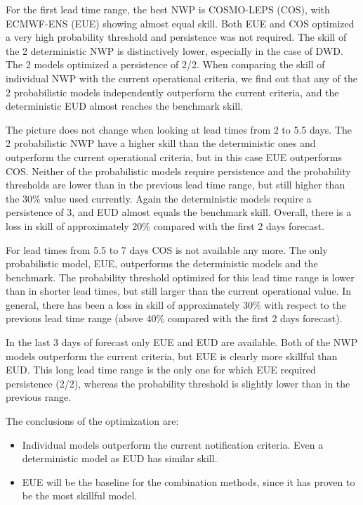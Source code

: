 \documentclass[preprint,12pt]{elsarticle}
\begin{document}
For the first lead time range, the best NWP is COSMO-LEPS (COS), with ECMWF-ENS (EUE) showing almost equal skill. Both EUE and COS optimized a very high probability threshold and persistence was not required. The skill of the 2 deterministic NWP is distinctively lower, especially in the case of DWD. The 2 models optimized a persistence of 2/2. When comparing the skill of individual NWP with the current operational criteria, we find out that any of the 2 probabilistic models independently outperform the current criteria, and the deterministic EUD almost reaches the benchmark skill.

The picture does not change when looking at lead times from 2 to 5.5 days. The 2 probabilistic NWP have a higher skill than the deterministic ones and outperform the current operational criteria, but in this case EUE outperforms COS. Neither of the probabilistic models require persistence and the probability thresholds are lower than in the previous lead time range, but still higher than the 30\% value used currently. Again the deterministic models require a persistence of 3, and EUD almost equals the benchmark skill. Overall, there is a loss in skill of approximately 20\% compared with the first 2 days forecast. 

For lead times from 5.5 to 7 days COS is not available any more. The only probabilistic model, EUE, outperforms the deterministic models and the benchmark. The probability threshold optimized for this lead time range is lower than in shorter lead times, but still larger than the current operational value. In general, there has been a loss in skill of approximately 30\% with respect to the previous lead time range (above 40\% compared with the first 2 days forecast).

In the last 3 days of forecast only EUE and EUD are available. Both of the NWP models outperform the current criteria, but EUE is clearly more skillful than EUD. This long lead time range is the only one for which EUE required persistence (2/2), whereas the probability threshold is slightly lower than in the previous range.

The conclusions of the optimization are:

\begin{itemize}
    \item Individual models outperform the current notification criteria. Even a deterministic model as EUD has similar skill.
    \item EUE will be the baseline for the combination methods, since it has proven to be the most skillful model.
\end{itemize}
\end{document}
